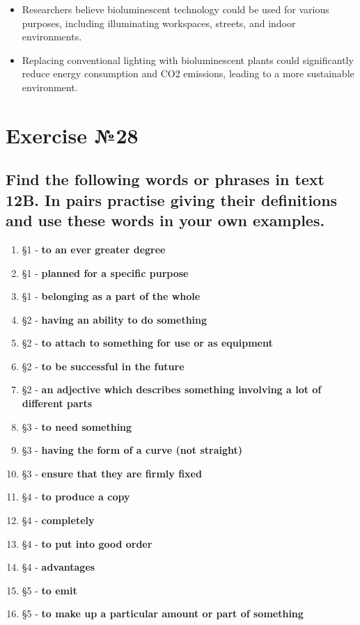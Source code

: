 \begin{itemize}
      \item Researchers believe bioluminescent technology could be used for various purposes, including illuminating workspaces, streets, and indoor environments.
\end{itemize}

\begin{itemize}
      \item Replacing conventional lighting with bioluminescent plants could significantly reduce energy consumption and CO2 emissions, leading to a more sustainable environment.
\end{itemize}

\section{Exercise №28}
\subsection*{Find the following words or phrases in text 12B. In pairs practise giving their definitions and use these words in your own examples.}
\begin{enumerate}
      \item §1 - \textbf{to an ever greater degree}
      \item §1 - \textbf{planned for a specific purpose}
      \item §1 - \textbf{belonging as a part of the whole}
      \item §2 - \textbf{having an ability to do something}
      \item §2 - \textbf{to attach to something for use or as equipment}
      \item §2 - \textbf{to be successful in the future}
      \item §2 - \textbf{an adjective which describes something involving a lot of different parts}
      \item §3 - \textbf{to need something}
      \item §3 - \textbf{having the form of a curve (not straight)}
      \item §3 - \textbf{ensure that they are firmly fixed}
      \item §4 - \textbf{to produce a copy}
      \item §4 - \textbf{completely}
      \item §4 - \textbf{to put into good order}
      \item §4 - \textbf{advantages}
      \item §5 - \textbf{to emit}
      \item §5 - \textbf{to make up a particular amount or part of something}
\end{enumerate}

